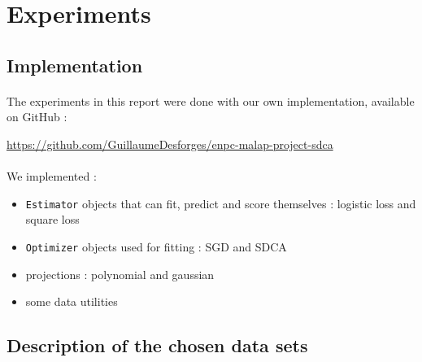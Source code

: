 \documentclass{article}
\begin{document}
\section{Experiments}

\subsection{Implementation}

\paragraph{}The experiments in this report were done with our own implementation, available on GitHub :
\begin{center}
    \url{ https://github.com/GuillaumeDesforges/enpc-malap-project-sdca }
\end{center}

\paragraph{}We implemented :
\begin{itemize}
	\item \texttt{Estimator} objects that can fit, predict and score themselves : logistic loss and square loss
	\item \texttt{Optimizer} objects used for fitting : SGD and SDCA
	\item projections : polynomial and gaussian
	\item some data utilities
\end{itemize}

\subsection{Description of the chosen data sets}
\end{document}
